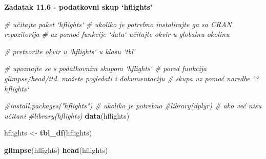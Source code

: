 \documentclass[]{book}
\newenvironment{Shaded}{\begin{snugshade}}{\end{snugshade}}
\newcommand{\KeywordTok}[1]{\textcolor[rgb]{0.13,0.29,0.53}{\textbf{#1}}}
\newcommand{\StringTok}[1]{\textcolor[rgb]{0.31,0.60,0.02}{#1}}
\newcommand{\CommentTok}[1]{\textcolor[rgb]{0.56,0.35,0.01}{\textit{#1}}}
\newcommand{\NormalTok}[1]{#1}
\theoremstyle{definition}
\theoremstyle{definition}
\theoremstyle{definition}
\theoremstyle{remark}
\begin{document}
\textbf{Zadatak 11.6 - podatkovni skup `hflights'}

\begin{Shaded}
\begin{Highlighting}[]
\CommentTok{# učitajte paket `hflights`}
\CommentTok{# ukoliko je potrebno instalirajte ga sa CRAN repozitorija}
\CommentTok{# uz pomoć funkcije `data` učitajte okvir u globalnu okolinu}

\CommentTok{# pretvorite okvir u `hflights` u klasu `tbl`}

\CommentTok{# upoznajte se s podatkovnim skupom `hflights`}
\CommentTok{# pored funkcija glimpse/head/itd. možete pogledati i dokumentaciju}
\CommentTok{# skupa uz pomoć naredbe `?hflights`}
\end{Highlighting}
\end{Shaded}

\begin{Shaded}
\begin{Highlighting}[]
\CommentTok{#install.packages("hflights")  # ukoliko je potrebno}
\CommentTok{#library(dplyr)               # ako već nisu učitani}
\CommentTok{#library(hflights)             }
\KeywordTok{data}\NormalTok{(hflights)}

\NormalTok{hflights <-}\StringTok{ }\KeywordTok{tbl_df}\NormalTok{(hflights)}

\KeywordTok{glimpse}\NormalTok{(hflights)}
\KeywordTok{head}\NormalTok{(hflights)}
\end{Highlighting}
\end{Shaded}
\end{document}
